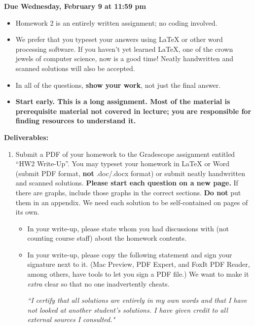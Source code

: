 \documentclass[11pt]{article}
\begin{document}
\maketitle
\fontsize{12}{15}\selectfont


\textbf{Due Wednesday, February 9 at 11:59 pm}

\begin{itemize}
\item
Homework 2 is an entirely written assignment; no coding involved.
\item
We prefer that you typeset your answers using \LaTeX{} or other word processing software. If you haven't yet learned \LaTeX, one of the crown jewels of computer science, now is a good time! Neatly handwritten and scanned solutions will also be accepted.
\item In all of the questions, \textbf{show your work}, not just the final answer.
\item
\textbf{Start early. This is a long assignment. Most of the material is prerequisite material not covered in lecture; you are responsible for finding resources to understand it.}
\end{itemize}

\textbf{Deliverables:}
\begin{enumerate}
  \item Submit a PDF of your homework
  to the Gradescope assignment entitled ``HW2 Write-Up''.
    You may typeset your homework in \LaTeX{} or Word (submit PDF format, \textbf{not} .doc/.docx format) or submit neatly handwritten and scanned solutions. \textbf{Please start each question on a new page.}
    If there are graphs, include those graphs in the correct sections. \textbf{Do not} put them in an appendix. We need each solution to be self-contained on pages of its own.
    \begin{itemize}
      \item In your write-up, please state whom you had discussions with (not counting course staff) about the homework contents.
      \item In your write-up, please copy the following statement and sign your signature next to it. (Mac Preview, PDF Expert, and FoxIt PDF Reader, among others, have tools to let you sign a PDF file.) We want to make it \textit{extra} clear so that no one inadvertently cheats.

            \textit{``I certify that all solutions are entirely in my own words and that I have not looked at another student's solutions. I have given credit to all external sources I consulted."}
    \end{itemize}

\end{enumerate}
\end{document}
